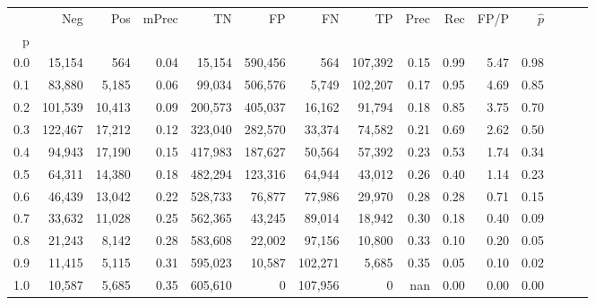 \begin{tabular}{rrrrrrrrrrrrrrr}
\toprule
{} &      Neg &     Pos & mPrec &       TN &       FP &       FN &       TP &  Prec &   Rec &  FP/P & $\hat{p}$ \\
p   &          &         &       &          &          &          &          &       &       &       &           \\
\midrule
0.0 &   15,154 &     564 &  0.04 &   15,154 &  590,456 &      564 &  107,392 &  0.15 &  0.99 &  5.47 &      0.98 \\
0.1 &   83,880 &   5,185 &  0.06 &   99,034 &  506,576 &    5,749 &  102,207 &  0.17 &  0.95 &  4.69 &      0.85 \\
0.2 &  101,539 &  10,413 &  0.09 &  200,573 &  405,037 &   16,162 &   91,794 &  0.18 &  0.85 &  3.75 &      0.70 \\
0.3 &  122,467 &  17,212 &  0.12 &  323,040 &  282,570 &   33,374 &   74,582 &  0.21 &  0.69 &  2.62 &      0.50 \\
0.4 &   94,943 &  17,190 &  0.15 &  417,983 &  187,627 &   50,564 &   57,392 &  0.23 &  0.53 &  1.74 &      0.34 \\
0.5 &   64,311 &  14,380 &  0.18 &  482,294 &  123,316 &   64,944 &   43,012 &  0.26 &  0.40 &  1.14 &      0.23 \\
0.6 &   46,439 &  13,042 &  0.22 &  528,733 &   76,877 &   77,986 &   29,970 &  0.28 &  0.28 &  0.71 &      0.15 \\
0.7 &   33,632 &  11,028 &  0.25 &  562,365 &   43,245 &   89,014 &   18,942 &  0.30 &  0.18 &  0.40 &      0.09 \\
0.8 &   21,243 &   8,142 &  0.28 &  583,608 &   22,002 &   97,156 &   10,800 &  0.33 &  0.10 &  0.20 &      0.05 \\
0.9 &   11,415 &   5,115 &  0.31 &  595,023 &   10,587 &  102,271 &    5,685 &  0.35 &  0.05 &  0.10 &      0.02 \\
1.0 &   10,587 &   5,685 &  0.35 &  605,610 &        0 &  107,956 &        0 &   nan &  0.00 &  0.00 &      0.00 \\
\bottomrule
\end{tabular}

